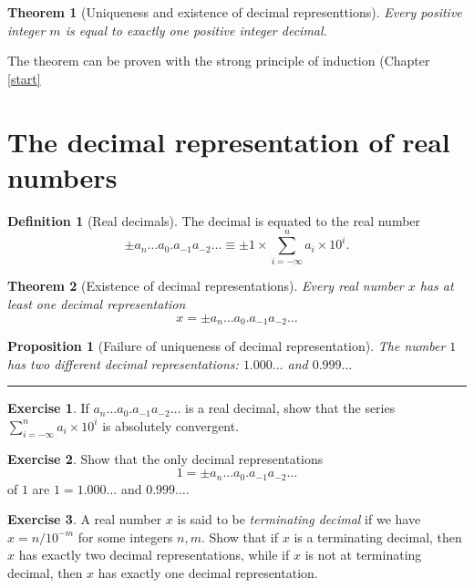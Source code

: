 \documentclass[
]{book}
\newtheorem{theorem}{Theorem}[chapter]
\newtheorem{proposition}{Proposition}[chapter]
\theoremstyle{definition}
\newtheorem{definition}{Definition}[chapter]
\theoremstyle{definition}
\theoremstyle{definition}
\newtheorem{exercise}{Exercise}[chapter]
\theoremstyle{definition}
\theoremstyle{remark}
\begin{document}
\begin{theorem}[Uniqueness and existence of decimal representtions]
Every positive integer \(m\) is equal to exactly one positive integer decimal.
\end{theorem}

The theorem can be proven with the strong principle of induction (Chapter \ref{start}

\section{The decimal representation of real numbers}\label{the-decimal-representation-of-real-numbers}

\begin{definition}[Real decimals]
The decimal is equated to the real number
\[
\pm a_n\dots a_0.a_{-1}a_{-2}\dots \equiv \pm 1\times \sum_{i=-\infty}^n a_i \times 10^i.
\]
\end{definition}

\begin{theorem}[Existence of decimal representations]
Every real number \(x\) has at least one decimal representation
\[
x=\pm a_n\dots a_0.a_{-1}a_{-2}\dots
\]
\end{theorem}

\begin{proposition}[Failure of uniqueness of decimal representation]
The number \(1\) has two different decimal representations: \(1.000\dots\) and \(0.999\dots\)
\end{proposition}

\begin{center}\rule{0.5\linewidth}{0.5pt}\end{center}

\begin{exercise}
If \(a_n\dots a_0.a_{-1}a_{-2}\dots\) is a real decimal, show that the series \(\sum_{i=-\infty}^n a_i \times 10^i\) is absolutely convergent.
\end{exercise}

\begin{exercise}
Show that the only decimal representations
\[
1=\pm a_n\dots a_0.a_{-1}a_{-2}\dots
\]
of \(1\) are \(1=1.000\dots\) and \(0.999\dots\).
\end{exercise}

\begin{exercise}
A real number \(x\) is said to be \emph{terminating decimal} if we have \(x=n/10^{-m}\) for some integers \(n,m\). Show that if \(x\) is a terminating decimal, then \(x\) has exactly two decimal representations, while if \(x\) is not at terminating decimal, then \(x\) has exactly one decimal representation.
\end{exercise}
\end{document}
